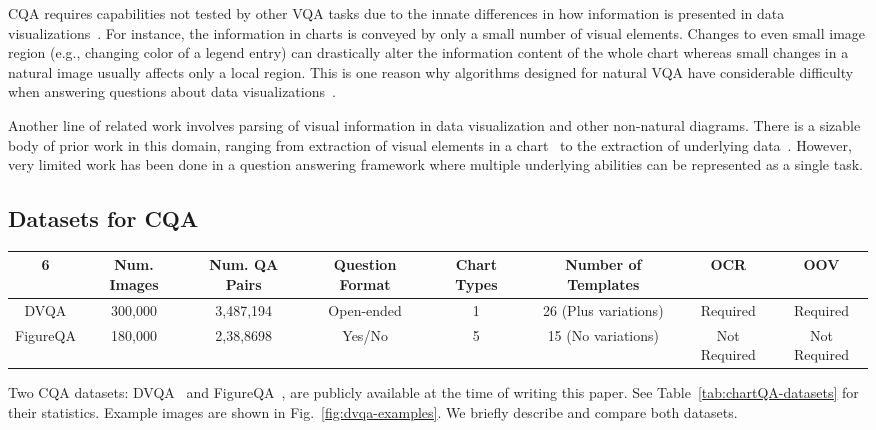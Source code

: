 \documentclass[10pt,twocolumn]{article}
\begin{document}
 CQA requires capabilities not tested by other VQA tasks due to the innate differences in how information is presented in data visualizations~\cite{kafle2018dvqa,figureqa}. For instance, the information in charts is conveyed by only a small number of visual elements. Changes to even small image region (e.g., changing color of a legend entry) can drastically alter the information content of the whole chart whereas small changes in a natural image usually affects only a local region. This is one reason why algorithms designed for natural VQA have considerable difficulty when answering questions about data visualizations~\cite{kafle2018dvqa,figureqa}.

Another line of related work involves parsing of visual information in data visualization and other non-natural diagrams. There is a sizable body of prior work in this domain, ranging from extraction of visual elements in a chart~\cite{poco2017reverse,tsutsui2017data} to the extraction of underlying data~\cite{savva2011revision,kallimani2013extraction,cliche2017scatteract}. However, very limited work has been done in a question answering framework where multiple underlying abilities can be represented as a single task.

\subsection{Datasets for CQA}\label{sec:datasets}



\begin{table*}
\footnotesize
\centering
\caption{FigureQA vs. DVQA \label{tab:chartQA-datasets}}
\vspace{2pt}
\begin{tabular}{@{}cccccccc@{}}
\toprule 
6

         & Num. Images & Num. QA Pairs & Question Format & Chart Types & Number of Templates       & OCR & OOV  \\ \midrule
DVQA     & 300,000     & 3,487,194     & Open-ended      & 1            & 26 (Plus variations) & Required & Required     \\
FigureQA & 180,000     & 2,38,8698     & Yes/No          & 5            & 15 (No variations)    & Not Required    & Not Required \\ \bottomrule
\end{tabular}
\end{table*}


Two CQA datasets: DVQA~\cite{kafle2018dvqa} and FigureQA~\cite{figureqa}, are publicly available at the time of writing this paper. See Table~\ref{tab:chartQA-datasets} for their statistics. Example images are shown in Fig.~\ref{fig:dvqa-examples}. We briefly describe and compare both datasets.
\end{document}

